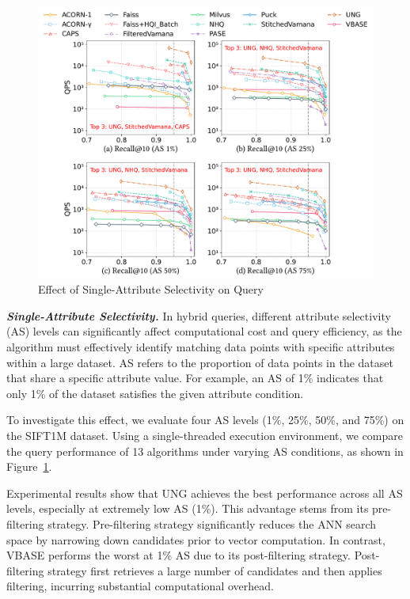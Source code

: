 \documentclass[sigconf, nonacm]{acmart}
\begin{document}
\begin{sloppypar}
\begin{figure}
    \centering
    \setlength{\abovecaptionskip}{0cm}
    \setlength{\belowcaptionskip}{-0.1cm}
    \includegraphics[width=\columnwidth]{figures/exp/exp_5_1_1_SingleLabel_1thread.pdf}
    \caption{Effect of Single-Attribute Selectivity on Query}
    \label{fig:exp_5_1_1_SingleLabel_1thread}
\end{figure}


\textit{\textbf{Single-Attribute Selectivity.}}
In hybrid queries, different attribute selectivity (AS) levels can significantly affect computational cost and query efficiency, as the algorithm must effectively identify matching data points with specific attributes within a large dataset. AS refers to the proportion of data points in the dataset that share a specific attribute value. For example, an AS of 1\% indicates that only 1\% of the dataset satisfies the given attribute condition. 

To investigate this effect, we evaluate four AS levels (1\%, 25\%, 50\%, and 75\%) on the SIFT1M dataset. Using a single-threaded execution environment, we compare the query performance of 13 algorithms under varying AS conditions, as shown in Figure~\ref{fig:exp_5_1_1_SingleLabel_1thread}.

Experimental results show that UNG achieves the best performance across all AS levels, especially at extremely low AS (1\%). 
This advantage stems from its pre-filtering strategy. Pre-filtering strategy significantly reduces the ANN search space by narrowing down candidates prior to vector computation. In contrast, VBASE performs the worst at 1\% AS due to its post-filtering strategy. Post-filtering strategy first retrieves a large number of candidates and then applies filtering, incurring substantial computational overhead.





\end{sloppypar}
\end{document}
